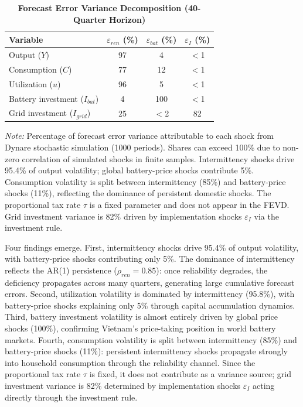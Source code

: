 \documentclass[12pt, a4paper]{article}
\begin{document}
\begin{table}[H]
    \centering
    \caption{\textbf{Forecast Error Variance Decomposition (40-Quarter Horizon)}}
    \label{tab:fevd}
    \renewcommand{\arraystretch}{1.3}
    \small
    \begin{tabular}{l c c c}
        \toprule
        \textbf{Variable} & $\varepsilon_{ren}$ (\%) & $\varepsilon_{bat}$ (\%) & $\varepsilon_I$ (\%) \\
        \midrule
        Output ($Y$) & 97 & 4 & $<$1 \\
        Consumption ($C$) & 77 & 12 & $<$1 \\
        Utilization ($u$) & 96 & 5 & $<$1 \\
        Battery investment ($I_{bat}$) & 4 & 100 & $<$1 \\
        Grid investment ($I_{grid}$) & 25 & $<$2 & 82 \\
        \bottomrule
    \end{tabular}
    \vspace{0.2cm}
    \parbox{\textwidth}{\footnotesize \textit{Note:} Percentage of forecast error variance attributable to each shock from Dynare stochastic simulation (1000 periods). Shares can exceed 100\% due to non-zero correlation of simulated shocks in finite samples. Intermittency shocks drive 95.4\% of output volatility; global battery-price shocks contribute 5\%. Consumption volatility is split between intermittency (85\%) and battery-price shocks (11\%), reflecting the dominance of persistent domestic shocks. The proportional tax rate $\tau$ is a fixed parameter and does not appear in the FEVD. Grid investment variance is 82\% driven by implementation shocks $\varepsilon_I$ via the investment rule.}
\end{table}

Four findings emerge. First, intermittency shocks drive 95.4\% of output volatility, with battery-price shocks contributing only 5\%. The dominance of intermittency reflects the AR(1) persistence ($\rho_{ren}=0.85$): once reliability degrades, the deficiency propagates across many quarters, generating large cumulative forecast errors. Second, utilization volatility is dominated by intermittency (95.8\%), with battery-price shocks explaining only 5\% through capital accumulation dynamics. Third, battery investment volatility is almost entirely driven by global price shocks (100\%), confirming Vietnam's price-taking position in world battery markets. Fourth, consumption volatility is split between intermittency (85\%) and battery-price shocks (11\%): persistent intermittency shocks propagate strongly into household consumption through the reliability channel. Since the proportional tax rate $\tau$ is fixed, it does not contribute as a variance source; grid investment variance is 82\% determined by implementation shocks $\varepsilon_I$ acting directly through the investment rule.
\end{document}
